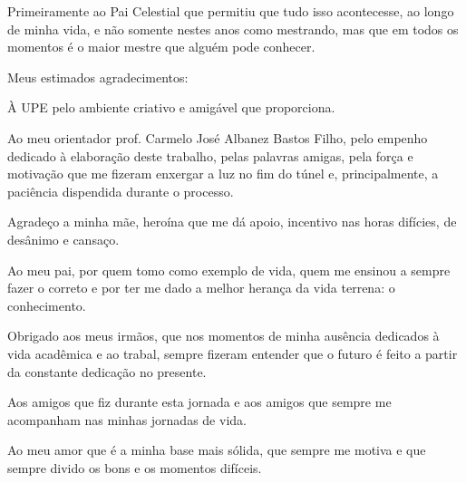 \begin{agradecimentos}

Primeiramente ao Pai Celestial que permitiu que tudo isso acontecesse, ao longo de minha vida, e não somente nestes anos como mestrando, mas que em todos os momentos é o maior mestre que alguém pode conhecer.

Meus estimados agradecimentos:

À UPE pelo ambiente criativo e amigável que proporciona.

Ao meu orientador prof. Carmelo José Albanez Bastos Filho, pelo empenho dedicado à elaboração deste trabalho, pelas palavras amigas, pela força e motivação que me fizeram enxergar a luz no fim do túnel e, principalmente, a paciência dispendida durante o processo.

Agradeço a minha mãe, heroína que me dá apoio, incentivo nas horas difícies, de desânimo e cansaço.

Ao meu pai, por quem tomo como exemplo de vida, quem me ensinou a sempre fazer o correto e por ter me dado a melhor herança da vida terrena: o conhecimento.

Obrigado aos meus irmãos, que nos momentos de minha ausência dedicados à vida acadêmica e ao trabal, sempre fizeram entender que o futuro é feito a partir da constante dedicação no presente.

Aos amigos que fiz durante esta jornada e aos amigos que sempre me acompanham nas minhas jornadas de vida.

Ao meu amor que é a minha base mais sólida, que sempre me motiva e que sempre divido os bons e os momentos difíceis.

\end{agradecimentos}